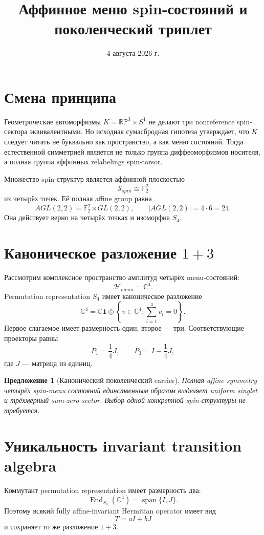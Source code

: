 \documentclass[12pt,a4paper]{article}
\title{Аффинное меню spin-состояний и поколенческий триплет}
\author{}
\date{4 августа 2026 г.}
\newtheorem{proposition}{Предложение}
\begin{document}
\maketitle

\section{Смена принципа}

Геометрические автоморфизмы \(K=\mathbb{RP}^3\times S^1\) не делают три nonreference spin-сектора эквивалентными. Но исходная сумасбродная гипотеза утверждает, что \(K\) следует читать не буквально как пространство, а как меню состояний. Тогда естественной симметрией является не только группа диффеоморфизмов носителя, а полная группа аффинных relabelings spin-torsor.

Множество spin-структур является аффинной плоскостью
\[
\mathcal S_{spin}\cong\mathbb F_2^2
\]
из четырёх точек. Её полная affine group равна
\[
AGL(2,2)=\mathbb F_2^2\rtimes GL(2,2),
\qquad
|AGL(2,2)|=4\cdot6=24.
\]
Она действует верно на четырёх точках и изоморфна \(S_4\).

\section{Каноническое разложение \(1+3\)}

Рассмотрим комплексное пространство амплитуд четырёх menu-состояний:
\[
\mathcal H_{menu}=\mathbb C^4.
\]
Permutation representation \(S_4\) имеет каноническое разложение
\[
\mathbb C^4
=\mathbb C\mathbf 1
\oplus
\left\{v\in\mathbb C^4:\sum_{i=1}^4v_i=0\right\}.
\]
Первое слагаемое имеет размерность один, второе --- три. Соответствующие проекторы равны
\[
P_1=\frac14J,
\qquad
P_3=I-\frac14J,
\]
где \(J\) --- матрица из единиц.

\begin{proposition}[Канонический поколенческий carrier]
Полная affine symmetry четырёх spin-menu состояний единственным образом выделяет uniform singlet и трёхмерный sum-zero sector. Выбор одной конкретной spin-структуры не требуется.
\end{proposition}

\section{Уникальность invariant transition algebra}

Коммутант permutation representation имеет размерность два:
\[
\operatorname{End}_{S_4}(\mathbb C^4)
=\operatorname{span}\{I,J\}.
\]
Поэтому всякий fully affine-invariant Hermitian operator имеет вид
\[
T=aI+bJ
\]
и сохраняет то же разложение \(1+3\).
\end{document}
